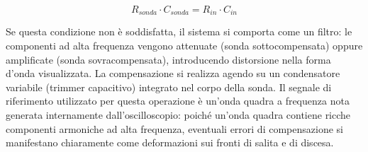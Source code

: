 \documentclass{article}
\begin{document}
    \begin{equation*}
        \boxed{R_{sonda} \cdot C_{sonda} = R_{in} \cdot C_{in}}
    \end{equation*}

    \noindent Se questa condizione non è soddisfatta, il sistema si comporta come un filtro: le componenti ad alta frequenza
    vengono attenuate (sonda sottocompensata) oppure amplificate (sonda sovracompensata), introducendo distorsione
    nella forma d'onda visualizzata. La compensazione si realizza agendo su un condensatore variabile (trimmer capacitivo)
    integrato nel corpo della sonda. Il segnale di riferimento utilizzato per questa operazione è un'onda quadra a frequenza
    nota generata internamente dall'oscilloscopio: poiché un'onda quadra contiene ricche componenti armoniche ad alta frequenza,
    eventuali errori di compensazione si manifestano chiaramente come deformazioni sui fronti di salita e di discesa.
    \\
\end{document}
